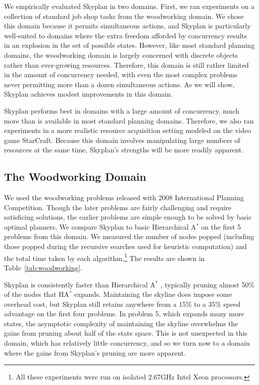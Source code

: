 \documentclass[letterpaper]{article}
\theoremstyle{plain} \newtheorem{theorem}{Theorem} \newtheorem{proposition}{Proposition} \newtheorem{lemma}{Lemma}
\theoremstyle{definition} \newtheorem{definition}{Definition} \newtheorem{conjecture}{Conjecture} \newtheorem*{example}{Example}
\theoremstyle{remark} \newtheorem*{remark}{Remark} \newtheorem*{note}{Note} \newtheorem{case}{Case}
\newcommand{\Astar}{A$^*$ }
\begin{document}
We empirically evaluated Skyplan in two domains. First, we ran experiments on a collection
of standard job shop tasks from the woodworking domain. We chose this domain because it
permits simultaneous actions, and Skyplan is particularly well-suited to domains where the
extra freedom afforded by concurrency results in an explosion in the set of possible
states. However, like most standard planning domains, the woodworking domain is largely concerned with
discrete objects rather than ever-growing resources. Therefore, this domain is still rather limited in the
amount of concurrency needed, with even the most complex problems never permitting more
than a dozen simultaneous actions. As we will show, Skyplan achieves modest improvements in this domain. 

Skyplan performs best in domains with a large amount of concurrency, much more than is available in most
standard planning domains. Therefore, we also ran experiments in a more realistic
resource acquisition setting modeled on the video game StarCraft. Because this domain involves
manipulating large numbers of resources at the same time, Skyplan's strengths will be more
readily apparent.

\subsection{The Woodworking Domain}

We used the woodworking problems released with 2008
International Planning Competition.
Though the later problems are fairly challenging and require satisficing solutions,
the earlier problems are simple enough to be solved by basic optimal planners. We compare
Skyplan to basic Hierarchical \Astar on the first 5 problems from this domain. We measured
the number of nodes popped (including those popped during the recursive searches used
for heuristic computation) and the total time taken by each algorithm.\footnote{All
these experiments were run on isolated 2.67GHz Intel Xeon processors.} The results are
shown in Table~\ref{tab:woodworking}.

Skyplan is consistently faster than Hierarchical \Astar, typically pruning almost 50\% of the
nodes that H\Astar expands. Maintaining the skyline does impose some overhead cost, but Skyplan
still retains anywhere from a 15\% to a 35\% speed advantage on the first four problems. In problem 5, which expands many more states, the asymptotic complexity of maintaining the skyline overwhelms the gains from pruning about half of the state space. This is not unexpected in this domain, which has relatively little concurrency, and so we turn now to a domain where the gains from Skyplan's pruning are more apparent.
\end{document}
